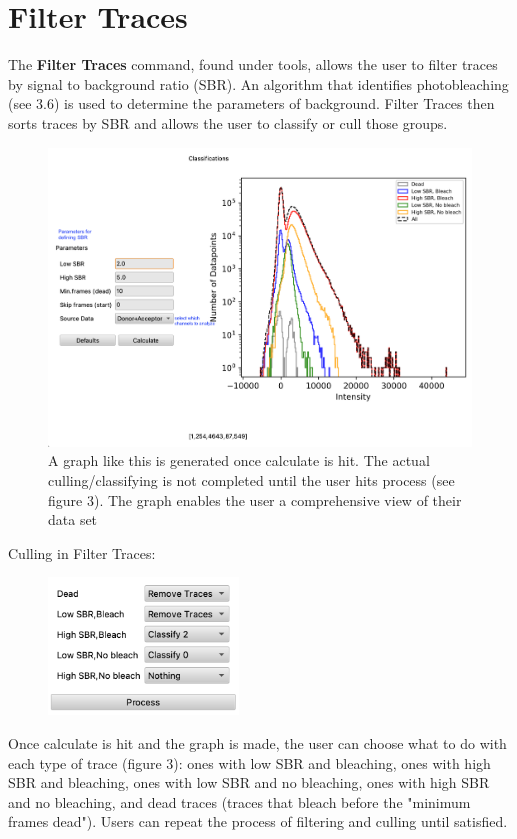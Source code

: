 \documentclass[11pt,a5paper,footinclude=true,headinclude=true]{scrbook} %
\begin{document}
\section{Filter Traces}
    The \textbf{Filter Traces} command, found under tools, allows the user to filter traces by signal to background ratio (SBR). An algorithm that identifies photobleaching (see 3.6) is used to determine the parameters of background. Filter Traces then sorts traces by SBR and allows the user to classify or cull those groups. 

    \begin{figure} [h]
    \centering
    \includegraphics[scale=0.3]{FilterTracesGraphic2.png}
    \caption{A graph like this is generated once calculate is hit. The actual culling/classifying is not completed until the user hits process (see figure 3). The graph enables the user a comprehensive view of their data set}
    \end{figure}
    
    \pagebreak
    Culling in Filter Traces:
    \\
    \begin{figure}
    \begin{center}
    \includegraphics[width=0.45\textwidth]{FilterTracesProcess.png}
    \caption{}
  \end{center}
 
        
    \end{figure}
    Once calculate is hit and the graph is made, the user can choose what to do with each type of trace (figure 3): ones with low SBR and bleaching, ones with high SBR and bleaching, ones with low SBR and no bleaching, ones with high SBR and no bleaching, and dead traces (traces that bleach before the "minimum frames dead"). Users can repeat the process of filtering and culling until satisfied. 
   
\end{document}
